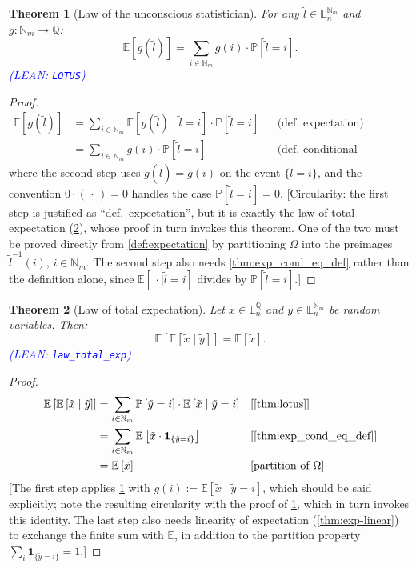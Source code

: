 \documentclass[letterpaper]{article}
\theoremstyle{plain}
\newtheorem{theorem}{Theorem}[subsection]
\theoremstyle{definition}
\theoremstyle{remark}
\newcommand{\Nats}{\mathbb{N}}
\newcommand{\E}{\mathbb{E}}
\newcommand{\PP}{\mathbb{P}}
\newcommand{\why}[1]{\text{[#1]}}
\newcommand{\cc}[1]{\textcolor{ccolor}{[#1]}}
\newcommand{\lean}[1]{\textcolor{blue}{(\emph{LEAN}: \texttt{#1})}}
\newcommand{\leanok}{}
\begin{document}
\begin{theorem}[Law of the unconscious statistician] \label{thm:lotus}
  For any  $\tilde{l} \in \mathbb{L}_n^{\Nats_m}$ and $g\colon \Nats_m \to \mathbb{Q}$:
  \[
    \E\left[g(\tilde{l})\right] = \sum_{i \in \Nats_m} g(i) \cdot  \PP\left[\tilde{l} = i\right].
  \]
  \lean{LOTUS} \leanok
\end{theorem}
\begin{proof}
\begin{align*}
  \E\left[g(\tilde{l})\right]
  &= \sum_{i \in \mathbb{N}_m} \E\left[g(\tilde{l}) \mid \tilde{l} = i\right] \cdot \PP\left[\tilde{l} = i\right] && \text{(def.\ expectation)} \\
  &= \sum_{i \in \mathbb{N}_m} g(i) \cdot \PP\left[\tilde{l} = i\right] && \text{(def.\ conditional expectation)}
\end{align*}
where the second step uses $g(\tilde{l}) = g(i)$ on the event $\{\tilde{l} = i\}$, and the convention $0 \cdot (\,\cdot\,) = 0$ handles the case $\PP[\tilde{l} = i] = 0$.
\cc{Circularity: the first step is justified as ``def.\ expectation'', but it is exactly the law of total expectation (\cref{thm:total-expectation}), whose proof in turn invokes this theorem. One of the two must be proved directly from \cref{def:expectation} by partitioning $\Omega$ into the preimages $\tilde{l}^{-1}(i)$, $i\in \Nats_m$. The second step also needs \cref{thm:exp_cond_eq_def} rather than the definition alone, since $\E[\,\cdot \mid \tilde{l}=i]$ divides by $\PP[\tilde{l}=i]$.}
\end{proof}

\begin{theorem}[Law of total expectation] \label{thm:total-expectation}
Let $\tilde{x} \in \mathbb{L}_n^{\mathbb{Q}}$ and $\tilde{y} \in \mathbb{L}_{n}^{\mathbb{N}_m}$ be random variables. Then:
\[
\E\left[\E\left[\tilde{x} \mid  \tilde{y}\right]\right] = \E \left[ \tilde{x} \right].
\]
\lean{law\_total\_exp} \leanok
\end{theorem}
\begin{proof}
\begin{align*}
  \E\left[\E\left[\tilde{x} \mid \tilde{y}\right]\right]  &= \sum_{i \in \mathbb{N}_m} \PP \left[\tilde{y} = i\right] \cdot \E\left[\tilde{x} \mid \tilde{y} = i\right] && \why{\cref{thm:lotus}} \\
  &= \sum_{i \in  \mathbb{N}_m} \E\left[\tilde{x} \cdot \mathbf{1}_{\{\tilde{y} = i\}}\right] && \why{\cref{thm:exp_cond_eq_def}} \\
  &= \E\left[\tilde{x}\right] && \why{partition of $\Omega$}
\end{align*}
\cc{The first step applies \cref{thm:lotus} with $g(i) := \E[\tilde{x}\mid\tilde{y}=i]$, which should be said explicitly; note the resulting circularity with the proof of \cref{thm:lotus}, which in turn invokes this identity. The last step also needs linearity of expectation (\cref{thm:exp-linear}) to exchange the finite sum with $\E$, in addition to the partition property $\sum_{i} \mathbf{1}_{\{\tilde{y}=i\}} = 1$.}
\end{proof}
\end{document}
